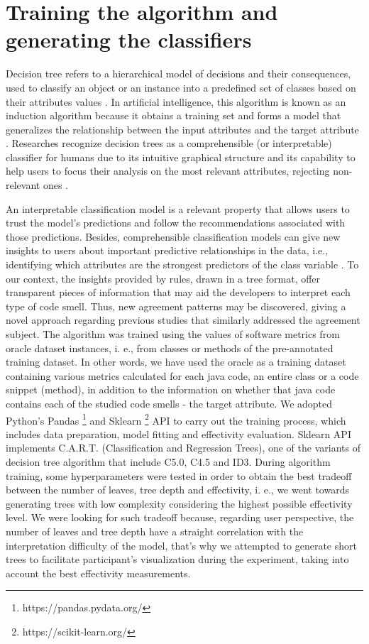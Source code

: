 \section{Training the algorithm and generating the classifiers}

Decision tree refers to a hierarchical model of decisions and their consequences, used to classify an object or an instance into a predefined set of classes based on their attributes values \cite{rokach2008data}. In artificial intelligence, this algorithm is known as an induction algorithm because it obtains a training set and forms a model that generalizes the relationship between the input attributes and the target attribute \cite{rokach2008data}. 
Researches recognize decision trees as a comprehensible (or interpretable) classifier for humans \cite{guidotti2018survey} due to its intuitive graphical structure and its capability to help users to focus their analysis on the most relevant attributes, rejecting non-relevant ones \cite{freitas2014comprehensible}.

An interpretable classification model is a relevant property that allows users to trust the model's predictions and follow the recommendations associated with those predictions. Besides, comprehensible classification models can give new insights to users about important predictive relationships in the data, i.e., identifying which attributes are the strongest predictors of the class variable \cite{freitas2014comprehensible}. To our context, the insights provided by rules, drawn in a tree format, offer transparent pieces of information that may aid the developers to interpret each type of code smell. Thus, new agreement patterns may be discovered, giving a novel approach regarding previous studies \cite{hozano2018you} that similarly addressed the agreement subject. 
The algorithm was trained using the values of software metrics from oracle dataset instances, i. e., from classes or methods of the pre-annotated training dataset.  In other words, we have used the oracle as a training dataset containing various metrics calculated for each java code, an entire class or a code snippet (method), in addition to the information on whether that java code contains each of the studied code smells - the target attribute.    
We adopted Python's Pandas \footnote{https://pandas.pydata.org/} and Sklearn \footnote{https://scikit-learn.org/} API to carry out the training process, which includes data preparation, model fitting and effectivity evaluation. Sklearn API implements C.A.R.T. (Classification and Regression Trees), one of the variants of decision tree algorithm that include C5.0, C4.5 and ID3. During algorithm training, some hyperparameters were tested in order to obtain the best tradeoff between the number of leaves, tree depth and effectivity, i. e., we went towards generating trees with low complexity considering the highest possible effectivity level. We were looking for such tradeoff because, regarding user perspective, the number of leaves and tree depth have a straight correlation with the interpretation difficulty \cite{luvstrek2016makes} of the model, that's why we attempted to generate short trees to facilitate participant's visualization during the experiment, taking into account the best effectivity measurements.

